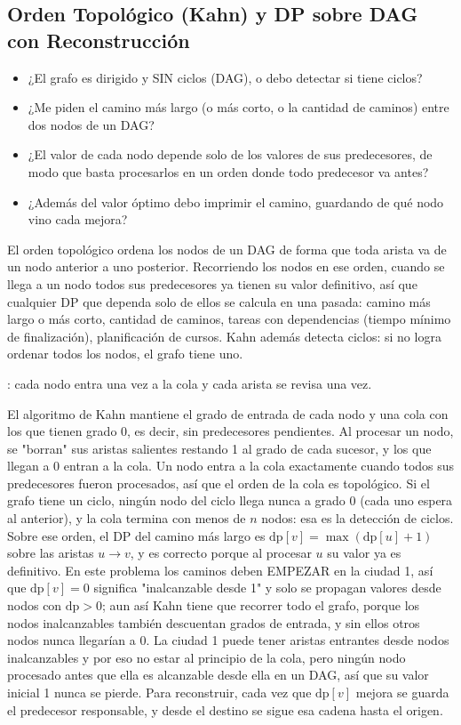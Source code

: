 \subsection{Orden Topológico (Kahn) y DP sobre DAG con Reconstrucción}
\label{alg:4-15}


\begin{itemize}
\item ¿El grafo es dirigido y SIN ciclos (DAG), o debo detectar si tiene ciclos?
\item ¿Me piden el camino más largo (o más corto, o la cantidad de caminos) entre dos nodos de un DAG?
\item ¿El valor de cada nodo depende solo de los valores de sus predecesores, de modo que basta procesarlos en un orden donde todo predecesor va antes?
\item ¿Además del valor óptimo debo imprimir el camino, guardando de qué nodo vino cada mejora?
\end{itemize}

 El orden topológico ordena los nodos de un DAG de forma que toda arista va de un nodo anterior a uno posterior. Recorriendo los nodos en ese orden, cuando se llega a un nodo todos sus predecesores ya tienen su valor definitivo, así que cualquier DP que dependa solo de ellos se calcula en una pasada: camino más largo o más corto, cantidad de caminos, tareas con dependencias (tiempo mínimo de finalización), planificación de cursos. Kahn además detecta ciclos: si no logra ordenar todos los nodos, el grafo tiene uno.

 : cada nodo entra una vez a la cola y cada arista se revisa una vez.

 El algoritmo de Kahn mantiene el grado de entrada de cada nodo y una cola con los que tienen grado 0, es decir, sin predecesores pendientes. Al procesar un nodo, se "borran" sus aristas salientes restando 1 al grado de cada sucesor, y los que llegan a 0 entran a la cola. Un nodo entra a la cola exactamente cuando todos sus predecesores fueron procesados, así que el orden de la cola es topológico. Si el grafo tiene un ciclo, ningún nodo del ciclo llega nunca a grado 0 (cada uno espera al anterior), y la cola termina con menos de $n$ nodos: esa es la detección de ciclos. Sobre ese orden, el DP del camino más largo es $\text{dp}[v] = \max(\text{dp}[u] + 1)$ sobre las aristas $u \to v$, y es correcto porque al procesar $u$ su valor ya es definitivo. En este problema los caminos deben EMPEZAR en la ciudad 1, así que $\text{dp}[v] = 0$ significa "inalcanzable desde 1" y solo se propagan valores desde nodos con $\text{dp} > 0$; aun así Kahn tiene que recorrer todo el grafo, porque los nodos inalcanzables también descuentan grados de entrada, y sin ellos otros nodos nunca llegarían a 0. La ciudad 1 puede tener aristas entrantes desde nodos inalcanzables y por eso no estar al principio de la cola, pero ningún nodo procesado antes que ella es alcanzable desde ella en un DAG, así que su valor inicial 1 nunca se pierde. Para reconstruir, cada vez que $\text{dp}[v]$ mejora se guarda el predecesor responsable, y desde el destino se sigue esa cadena hasta el origen.~\cite{kahn1962}

